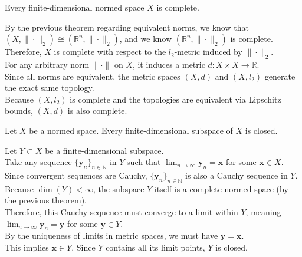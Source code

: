 
\begin{theorem}
    Every finite-dimensional normed space $X$ is complete.
\end{theorem}

\begin{pfbox}
    By the previous theorem regarding equivalent norms, we know that $(X, \|\cdot\|_2) \cong (\mathbb{R}^n, \|\cdot\|_2)$, and we know $(\mathbb{R}^n, \|\cdot\|_2)$ is complete. \\
    Therefore, $X$ is complete with respect to the $l_2$-metric induced by $\|\cdot\|_2$. \\
    For any arbitrary norm $\|\cdot\|$ on $X$, it induces a metric $d: X \times X \to \mathbb{R}$. \\
    Since all norms are equivalent, the metric spaces $(X, d)$ and $(X, l_2)$ generate the exact same topology. \\
    Because $(X, l_2)$ is complete and the topologies are equivalent via Lipschitz bounds, $(X, d)$ is also complete.
\end{pfbox}


\begin{theorem}
    Let $X$ be a normed space. Every finite-dimensional subspace of $X$ is closed.
\end{theorem}

\begin{pfbox}
    Let $Y \subset X$ be a finite-dimensional subspace. \\
    Take any sequence $\{\mathbf{y}_n\}_{n \in \mathbb{N}}$ in $Y$ such that $\displaystyle \lim_{n \to \infty} \mathbf{y}_n = \mathbf{x}$ for some $\mathbf{x} \in X$. \\
    Since convergent sequences are Cauchy, $\{\mathbf{y}_n\}_{n \in \mathbb{N}}$ is also a Cauchy sequence in $Y$. \\
    Because $\dim(Y) < \infty$, the subspace $Y$ itself is a complete normed space (by the previous theorem). \\
    Therefore, this Cauchy sequence must converge to a limit within $Y$, meaning $\displaystyle \lim_{n \to \infty} \mathbf{y}_n = \mathbf{y}$ for some $\mathbf{y} \in Y$. \\
    By the uniqueness of limits in metric spaces, we must have $\mathbf{y} = \mathbf{x}$. \\
    This implies $\mathbf{x} \in Y$. Since $Y$ contains all its limit points, $Y$ is closed.
\end{pfbox}


